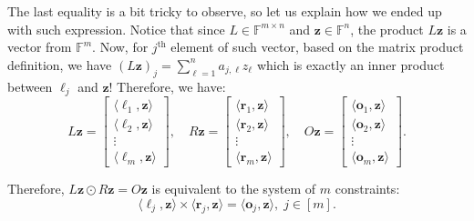 \documentclass[../../book.tex]{subfiles}
\begin{document}
The last equality is a bit tricky to observe, so let us explain how we ended up with such expression. Notice that since $L \in \mathbb{F}^{m \times n}$ and $\mathbf{z} \in \mathbb{F}^n$, the product $L\mathbf{z}$ is a vector from $\mathbb{F}^m$. Now, for $j^{\text{th}}$ element of such vector, based on the matrix product definition, we have $(L\mathbf{z})_j = \sum_{\ell=1}^na_{j,\ell}z_{\ell}$ which is exactly an inner product between $\boldsymbol{\ell}_j$ and $\mathbf{z}$! Therefore, we have:
\begin{equation*}
    L\mathbf{z} = \begin{bmatrix}
        \langle \boldsymbol{\ell}_1, \mathbf{z}\rangle \\
        \langle \boldsymbol{\ell}_2, \mathbf{z}\rangle \\
        \vdots \\
        \langle \boldsymbol{\ell}_m, \mathbf{z}\rangle 
    \end{bmatrix}, \quad
    R\mathbf{z} = \begin{bmatrix}
        \langle \boldsymbol{r}_1, \mathbf{z}\rangle \\
        \langle \boldsymbol{r}_2, \mathbf{z}\rangle \\
        \vdots \\
        \langle \boldsymbol{r}_m, \mathbf{z}\rangle 
    \end{bmatrix}, \quad
    O\mathbf{z} = \begin{bmatrix}
        \langle \boldsymbol{o}_1, \mathbf{z}\rangle \\
        \langle \boldsymbol{o}_2, \mathbf{z}\rangle \\
        \vdots \\
        \langle \boldsymbol{o}_m, \mathbf{z}\rangle 
    \end{bmatrix}.
\end{equation*}

Therefore, $L\mathbf{z} \odot R\mathbf{z} = O\mathbf{z}$ is equivalent to the system of $m$ constraints:
\begin{equation*}
    \langle \boldsymbol{\ell}_j, \mathbf{z}\rangle \times \langle \boldsymbol{r}_j, \mathbf{z} \rangle = \langle \boldsymbol{o}_j, \mathbf{z} \rangle, \; j \in [m].
\end{equation*}
\end{document}
